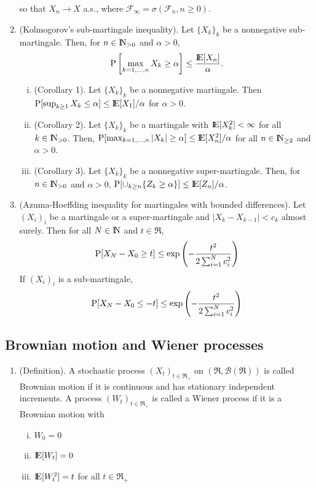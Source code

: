 \documentclass[a4paper,10pt]{article}
\begin{document}
\begin{enumerate}
       so that $X_n\to X$ a.s., where $\mathcal{F}_\infty = \sigma(\mathcal{F}_n, n\geq 0)$.
 \item (Kolmogorov's sub-martingale inequality). Let $\{X_k\}_k$ be a nonnegative sub-martingale.
       Then, for $n\in\N_{>0}$ and $\alpha>0$,
       \[
        \prob\left[ \max_{k=1,\ldots, n}X_k \geq \alpha\right] \leq \frac{\E[X_n]}{\alpha}.
       \]
       \begin{enumerate}[i.]
        \item (Corollary 1). Let $\{X_k\}_k$ be a nonnegative martingale. 
              Then $\prob[\sup_{k\geq 1}X_k \leq \alpha]\leq\E[X_1]/\alpha$ for $\alpha>0$.
        \item (Corollary 2). Let $\{X_k\}_k$ be a martingale with $\E[X_k^2]< \infty$ for all $k\in\N_{>0}$. 
               Then, $\prob[\max_{k=1,\ldots, n}|X_k|\geq \alpha]\leq \E[X_n^2]/\alpha$ for all $n\in \N_{\geq 2}$
               and $\alpha>0$.
        \item (Corollary 3). Let $\{X_k\}_k$ be a nonnegative super-martingale. Then, for $n\in\N_{>0}$
              and $\alpha>0$, $\prob[\cup_{k\geq n}\{Z_k\geq \alpha\}]\leq\E[Z_n]/\alpha$.
       \end{enumerate}


 \item (Azuma-Hoeffding inequality for martingales with bounded differences). Let $(X_i)_i$
       be a martingale or a  super-martingale and $|X_k-X_{k-1}|<c_{k}$ almost surely. Then for all $N\in\N$
       and $t\in\Re$,
       \[
        \mathrm{P}[X_N-X_0\geq t] \leq \exp \left(-\frac{t^2}{2\sum_{i=1}^{N}c_i^2}\right)
       \]
       If $(X_i)_i$ is a sub-martingale, 
       \[
        \mathrm{P}[X_N-X_0\leq -t] \leq \exp \left(-\frac{t^2}{2\sum_{i=1}^{N}c_i^2}\right)
       \]

\end{enumerate}


\subsection{Brownian motion and Wiener processes}
\begin{enumerate}
 \item (Definition). A stochastic process \((X_t)_{t\in \Re_+}\) on \((\Re, \mathcal{B}(\Re))\) is 
 called Brownian motion if it is continuous and has stationary independent increments. A process 
 \((W_t)_{t\in\Re_+}\) is called a Wiener process if it is a Brownian motion with 
 \begin{enumerate}[i.]
  \item \(W_0 = 0\)
  \item \(\E[W_t] = 0\)
  \item \(\E[W_t^2] = t\) for all \(t\in\Re_+\)
 \end{enumerate}

\end{enumerate}
\end{document}
